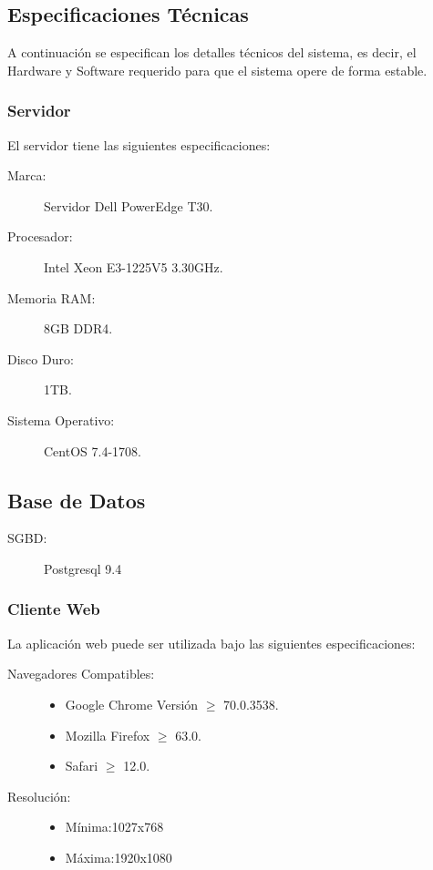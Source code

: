 \subsection{Especificaciones Técnicas}
A continuación se especifican los detalles técnicos del sistema, es decir, el Hardware y Software requerido para que el sistema opere de forma estable.

\subsubsection{Servidor}
El servidor tiene las siguientes especificaciones:
	\begin{description}
		\item[Marca:]Servidor Dell PowerEdge T30.
		\item[Procesador:]Intel Xeon E3-1225V5 3.30GHz.
		\item[Memoria RAM:]8GB DDR4.
		\item[Disco Duro:]1TB.
		\item[Sistema Operativo:] CentOS 7.4-1708.
	\end{description}

\subsection{Base de Datos}
	\begin{description}
		\item[SGBD:] Postgresql 9.4
	\end{description}

\subsubsection{Cliente Web}
La aplicación web puede ser utilizada bajo las siguientes especificaciones:
	\begin{description}
		\item[Navegadores Compatibles:]\hspace{0.5pt}
			\begin{itemize}
				\item Google Chrome Versión $\geq$ 70.0.3538.
				\item Mozilla Firefox $\geq$ 63.0.
				\item Safari $\geq$ 12.0.
			\end{itemize}
		\item[Resolución:]\hspace{0.5pt}
			\begin{itemize}
				\item Mínima:1027x768
				\item Máxima:1920x1080
			\end{itemize}
	\end{description}

